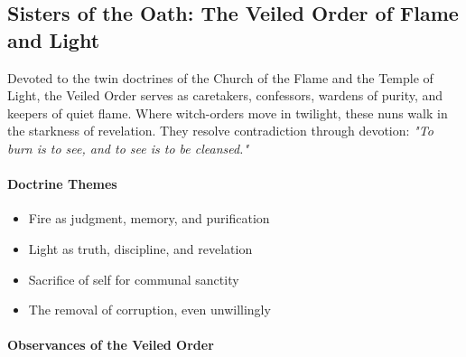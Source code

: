 \documentclass[11pt]{book}
\begin{document}
\subsection*{Sisters of the Oath: The Veiled Order of Flame and Light}

Devoted to the twin doctrines of the Church of the Flame and the Temple of Light,  
the Veiled Order serves as caretakers, confessors, wardens of purity, and  
keepers of quiet flame. Where witch-orders move in twilight, these nuns walk in  
the starkness of revelation. They resolve contradiction through devotion:  
\emph{"To burn is to see, and to see is to be cleansed."}

\paragraph{Doctrine Themes}
\begin{itemize}[leftmargin=1.5em]
    \item Fire as judgment, memory, and purification  
    \item Light as truth, discipline, and revelation  
    \item Sacrifice of self for communal sanctity  
    \item The removal of corruption, even unwillingly
\end{itemize}

\paragraph{Observances of the Veiled Order}
\end{document}
